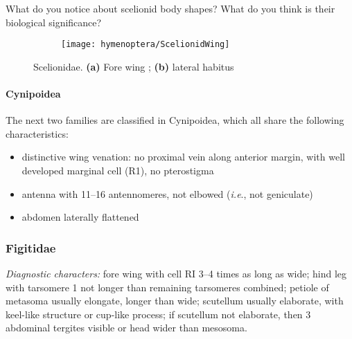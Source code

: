 \begin{theo}
{}What do you notice about scelionid body shapes? What do you think is their biological significance?
\end{theo}

\begin{figure}[ht!]
  \centering
\begin{subfigure}[ht!]{0.5\textwidth}
    \texttt{[image: hymenoptera/ScelionidWing]}
  \caption{}
  \label{fig:scelionid1}
\end{subfigure}
    \hfill
\begin{subfigure}[ht!]{0.4\textwidth}
  \caption{}
  \label{fig:scelionid2}
\end{subfigure}
    \caption{Scelionidae. \textbf{(a)} Fore wing \citep[][pg. 560]{goulet1993hymenoptera}; \textbf{(b)} lateral habitus \citep[][Fig. 207]{goulet1993hymenoptera}}\label{fig:scelionids}
\end{figure}

\paragraph*{Cynipoidea} The next two families are classified in Cynipoidea, which all share the following characteristics:
\begin{itemize}
\item distinctive wing venation: no proximal vein along anterior margin, with well developed marginal cell (R1), no pterostigma
\item antenna with 11--16 antennomeres, not elbowed (\textit{i.e}., not geniculate)
\item abdomen laterally flattened
\end{itemize}

\subsubsection{Figitidae}
\noindent{}\textit{Diagnostic characters:} fore wing with cell RI 3--4 times as long as wide; hind leg with tarsomere 1 not longer than remaining tarsomeres combined; petiole of metasoma usually elongate, longer than wide; scutellum usually elaborate, with keel-like structure or cup-like process; if scutellum not elaborate, then 3 abdominal tergites visible or head wider than mesosoma.\vspace{3mm}

